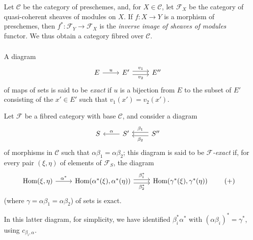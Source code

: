 \documentclass{article}
\theoremstyle{plain}
\theoremstyle{definition}
\newenvironment{definition}[1]
  {\renewcommand\theinnercustomdefinition{#1}\innercustomdefinition}
  {\endinnercustomdefinition}
\newenvironment{example}[1]
  {\renewcommand\theinnercustomexample{#1}\innercustomexample}
  {\endinnercustomexample}
\newcommand{\sh}[1]{{\mathscr{#1}}}
\newcommand{\cat}[1]{{\mathcal{#1}}}
\DeclareMathOperator{\Hom}{Hom}
\newcommand{\oldpage}[1]{\marginpar{\footnotesize$\Big\vert$ \textit{p.~#1}}}
\begin{document}
\begin{example}{2}
\label{example:A.1.1(2)}
  Let $\cat{C}$ be the category of preschemes, and, for $X\in\cat{C}$, let $\sh{F}_X$ be the category of quasi-coherent sheaves of modules on $X$.
  If $f\colon X\to Y$ is a morphism of preschemes, then $f^*\colon\sh{F}_Y\to\sh{F}_X$ is the
\oldpage{190-03}
  \emph{inverse image of sheaves of modules} functor.
  We thus obtain a category fibred over $\cat{C}$.
\end{example}


\subsubsection{}
\label{A.1.b}

\begin{definition}{1.2}
\label{definition:A.1.2}
  A diagram
  \[
    \begin{tikzcd}
      E \rar["u"]
      & E' \rar[shift left=1,"v_1"] \rar[shift right=1,swap,"v_2"]
      & E''
    \end{tikzcd}
  \]
  of maps of sets is said to be \emph{exact} if $u$ is a bijection from $E$ to the subset of $E'$ consisting of the $x'\in E'$ such that $v_1(x')=v_2(x')$.
\end{definition}

\begin{definition}{1.3}
\label{definition:A.1.3}
  Let $\sh{F}$ be a fibred category with base $\cat{C}$, and consider a diagram
  \[
    \begin{tikzcd}
      S
      & S' \lar[swap,"\alpha"]
      & S'' \lar[shift right=1,swap,"\beta_1"] \lar[shift left=1,"\beta_2"]
    \end{tikzcd}
  \]
  of morphisms in $\cat{C}$ such that $\alpha\beta_1=\alpha\beta_2$;
  this diagram is said to be \emph{$\sh{F}$-exact} if, for every pair $(\xi,\eta)$ of elements of $\sh{F}_S$, the diagram
  \[
  \label{equation-definition:A.1.3}
    \begin{tikzcd}
      \Hom(\xi,\eta) \rar["\alpha^*"]
      & \Hom(\alpha^*(\xi),\alpha^*(\eta)) \rar[shift left=1,"\beta_1^*"] \rar[shift right=1,swap,"\beta_2^*"]
      & \Hom(\gamma^*(\xi),\gamma^*(\eta))
    \end{tikzcd}
  \tag{+}
  \]
  (where $\gamma=\alpha\beta_1=\alpha\beta_2$) of sets is exact.

  In this latter diagram, for simplicity, we have identified $\beta_i^*\alpha^*$ with $(\alpha\beta_i)^*=\gamma^*$, using $c_{\beta_i,\alpha}$.
\end{definition}
\end{document}
